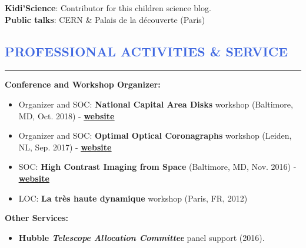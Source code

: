 \documentclass[12pt]{article}
\begin{document}
\vspace{0.5cm}
\textbf{Kidi'Science}: Contributor for this children science blog.\\

\textbf{Public talks}: CERN \& Palais de la découverte (Paris)\\

\vspace{-0.3cm}
\textcolor{RoyalBlue}{\section{\large PROFESSIONAL ACTIVITIES \& SERVICE}
\vspace{-0.35cm}\hrule}
\vspace{0.6cm}

\parbox{0.55\linewidth}{
\textbf{Conference and Workshop Organizer:}
\begin{itemize}
 \item \small Organizer and SOC: \textbf{National Capital Area Disks} workshop (Baltimore, MD, Oct. 2018) - \href{https://sites.google.com/view/ncad7-at-jhu/ncad7}{\underline{\textbf{website}}}
 \item \small Organizer and SOC: \textbf{Optimal Optical Coronagraphs} workshop (Leiden, NL, Sep. 2017) - \href{https://www.lorentzcenter.nl/lc/web/2017/924/info.php3?wsid=924&venue=Snellius}{\underline{\textbf{website}}}
 \item \small SOC: \textbf{High Contrast Imaging from Space} (Baltimore, MD, Nov. 2016) - \href{http://www.cvent.com/events/high-contrast-imaging-in-space-workshop/event-summary-eb3bb6bd54a342c5a15678daa49be683.aspx}{\underline{\textbf{website}}}
 \item \small LOC: \textbf{La très haute dynamique} workshop (Paris, FR, 2012)
\end{itemize}
\vspace{0.4cm}
\textbf{Other Services:}
\begin{itemize}
    \item \small \textbf{Hubble \textit{Telescope Allocation Committee}} panel support (2016).
\end{itemize}}
\hspace{0.2cm}
\end{document}
